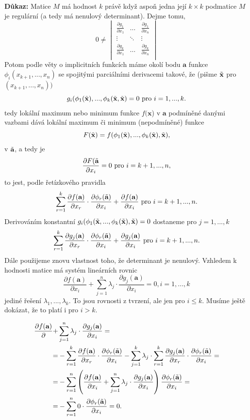 \documentclass[10pt]{article}
\begin{document}
\vspace{5mm}
\noindent
\textbf{Důkaz:} Matice $M$ má hodnost $k$ právě když aspoň jedna její $k\times k$ podmatice $M$ je regulární (a tedy má nenulový determinant). Dejme tomu,
\[ 0 \neq \begin{vmatrix}
\frac{\partial g_1}{\partial x_1} & \dots & \frac{\partial g_1}{\partial x_n}\\
\vdots & \ddots & \vdots\\
\frac{\partial g_k}{\partial x_1} & \dots & \frac{\partial g_k}{\partial x_n}\\
\end{vmatrix}\]
Potom podle věty o implicitních funkcích máme okolí bodu $\textbf{a}$ funkce $\phi_i(x_{k+1},...,x_n)$
se spojitými parciálními derivacemi takové, že (pišme $\Tilde{\textbf{x}}$ pro $(x_{k+1},...,x_n))$
\[g_i(\phi_1(\Tilde{\textbf{x}}),...,\phi_k(\Tilde{\textbf{x}},\Tilde{\textbf{x}}) = 0 \text{ pro } i=1,...,k.\]
tedy lokální maximum nebo minimum funkce $f(\textbf{x}$) v $\textbf{a}$ podmíněné danými vazbami dává lokální maximum či minimum (nepodmíněné) funkce
\[F(\Tilde{\textbf{x}}) = f(\phi_1(\Tilde{\textbf{x}}),...,\phi_k(\Tilde{\textbf{x}}),\Tilde{\textbf{x}}),\]
v $\Tilde{\textbf{a}}$, a tedy je 
\[\frac{\partial F(\Tilde{\textbf{a}}}{\partial x_i} = 0 \text{ pro } i = k+1,...,n,\]
to jest, podle řetízkového pravidla
\[\sum^k_{r=1}\frac{\partial f(\textbf{a})}{\partial x_r}\cdot \frac{\partial \phi_r(\Tilde{\textbf{a}})}{\partial x_i} + \frac{\partial f(\textbf{a})}{\partial x_i} \text{ pro } i = k+1,...,n.\]
Derivováním konstantní $g_i(\phi_1(\Tilde{\textbf{x}},...,\phi_k(\Tilde{\textbf{x}}),\Tilde{\textbf{x}}) = 0$ dostaneme pro $j = 1,...,k$
\[\sum^k_{r=1}\frac{\partial g_j(\textbf{a})}{\partial x_r}\cdot \frac{\partial \phi_r(\Tilde{\textbf{a}})}{\partial x_i} + \frac{\partial g_j(\textbf{a})}{\partial x_i} \text{ pro } i = k+1,...,n.\]
Dále použijeme znovu vlastnost toho, že determinant je nenulový. Vzhledem k hodnosti matice má systém lineárních rovnic
\[\frac{\partial f(\textbf{a})}{\partial x_i} + \sum^n_{j=1}\lambda_j\cdot\frac{\partial g_j(\textbf{a})}{\partial x_i} = 0, i = 1,...,k\]
jediné řešení $\lambda_1,...,\lambda_k.$ To jsou rovnosti z tvrzení, ale jen pro $i \leq k$. Musíme ještě dokázat, že to platí i pro $i > k$. 

\begin{align*}
\frac{\partial f(\textbf{a})}{\partial} + & \sum^n_{j=1}\lambda_j\cdot\frac{\partial g_j(\textbf{a})}{\partial x_i}=\\
= & - \sum^k_{r=1} \frac{\partial f(\textbf{a})}{\partial x_r}\cdot\frac{\partial \phi_r(\Tilde{\textbf{a}})}{\partial x_i} -
\sum^k_{j=1}\lambda_j\cdot\sum^k_{r=1}\frac{\partial g_j(\textbf{a})}{\partial x_r}\cdot\frac{\partial \phi_r(\Tilde{\textbf{a}})}{\partial x_i} =\\
= & - \sum^n_{r=1}\left(\frac{\partial f(\textbf{a})}{\partial x_i}+\sum^n_{j=1}\lambda_j\cdot\frac{\partial g_j(\textbf{a})}{\partial x_i}\right)\frac{\partial \phi_r(\Tilde{\textbf{a}})}{\partial x_i}=\\
= & - \sum^n_{r=1}0\cdot\frac{\partial \phi_r(\Tilde{\textbf{a}})}{\partial x_i}=0.
\end{align*}
\end{document}
